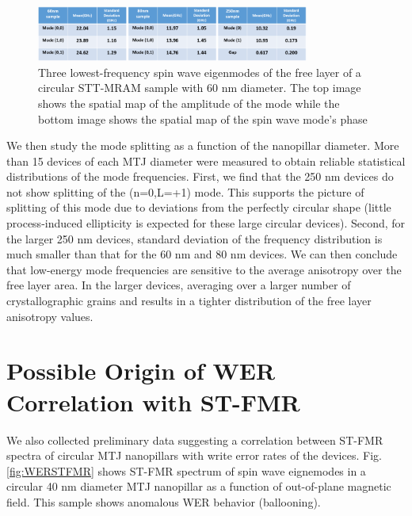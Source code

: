 \begin{figure}[h!]
  \centering
  \includegraphics[width=0.8\textwidth]{fig/broken/stastic-mode.png}
   \caption{Three lowest-frequency spin wave eigenmodes of the free layer of a circular STT-MRAM sample with 60 nm diameter. The top image shows the spatial map of the amplitude of the mode while the bottom image shows the spatial map of the spin wave mode’s phase}
  \label{fig:statmod1}
\end{figure}


We then study the mode splitting as a function of the nanopillar diameter. More than 15 devices of each MTJ diameter were measured to obtain reliable statistical distributions of the mode frequencies.  First, we find that the 250 nm devices do not show splitting of the (n=0,L=+1) mode. This supports the picture of splitting of this mode due to deviations from the perfectly circular shape (little process-induced ellipticity is expected for these large circular devices). Second, for the larger 250 nm devices, standard deviation of the frequency distribution is much smaller than that for the 60 nm and 80 nm devices. We can then conclude that low-energy mode frequencies are sensitive to the average anisotropy over the free layer area. In the larger devices, averaging over a larger number of crystallographic grains and results in a tighter distribution of the free layer anisotropy values.







\newpage

\section{Possible Origin of WER Correlation with ST-FMR}

We also collected preliminary data suggesting a correlation between ST-FMR spectra of circular MTJ nanopillars with write error rates of the devices.  Fig.\ref{fig:WERSTFMR} shows ST-FMR spectrum of spin wave eignemodes in a circular 40 nm diameter MTJ nanopillar as a function of out-of-plane magnetic field. This sample shows anomalous WER behavior (ballooning).

